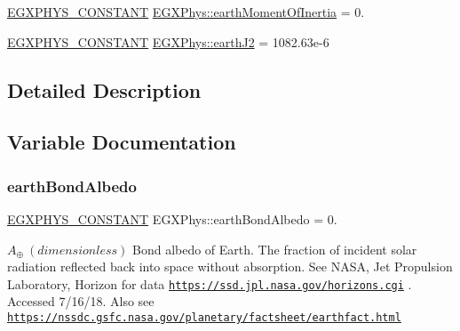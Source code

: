 \begin{DoxyCompactItemize}
\mbox{\hyperlink{group___e_g_x_phys-_constants-_macros_ga76980d288494ce1714c9ac68a95ba702}{E\+G\+X\+P\+H\+Y\+S\+\_\+\+C\+O\+N\+S\+T\+A\+NT}} \mbox{\hyperlink{group___e_g_x_phys-_constants-_astrophysics-_solar_system-_earth-_bulk_ga4b3a512e9d562530710100f65695ab13}{E\+G\+X\+Phys\+::earth\+Moment\+Of\+Inertia}} = 0.
\item 
\mbox{\hyperlink{group___e_g_x_phys-_constants-_macros_ga76980d288494ce1714c9ac68a95ba702}{E\+G\+X\+P\+H\+Y\+S\+\_\+\+C\+O\+N\+S\+T\+A\+NT}} \mbox{\hyperlink{group___e_g_x_phys-_constants-_astrophysics-_solar_system-_earth-_bulk_ga8d661a52948229a59e9eabf97af51faf}{E\+G\+X\+Phys\+::earth\+J2}} = 1082.\+63e-\/6
\end{DoxyCompactItemize}


\subsection{Detailed Description}


\subsection{Variable Documentation}
\mbox{\label{group___e_g_x_phys-_constants-_astrophysics-_solar_system-_earth-_bulk_gad71c87a7e90df69eed292f9a54376fff}} 
\subsubsection{\texorpdfstring{earth\+Bond\+Albedo}{earthBondAlbedo}}
{\footnotesize\ttfamily \mbox{\hyperlink{group___e_g_x_phys-_constants-_macros_ga76980d288494ce1714c9ac68a95ba702}{E\+G\+X\+P\+H\+Y\+S\+\_\+\+C\+O\+N\+S\+T\+A\+NT}} E\+G\+X\+Phys\+::earth\+Bond\+Albedo = 0.}

$ A_{\oplus} \ (dimensionless)$ Bond albedo of Earth. The fraction of incident solar radiation reflected back into space without absorption. See N\+A\+SA, Jet Propulsion Laboratory, Horizon for data \href{https://ssd.jpl.nasa.gov/horizons.cgi}{\tt https\+://ssd.\+jpl.\+nasa.\+gov/horizons.\+cgi} . Accessed 7/16/18. Also see \href{https://nssdc.gsfc.nasa.gov/planetary/factsheet/earthfact.html}{\tt https\+://nssdc.\+gsfc.\+nasa.\+gov/planetary/factsheet/earthfact.\+html} \mbox{\label{group___e_g_x_phys-_constants-_astrophysics-_solar_system-_earth-_bulk_ga7ff84de93ff11190d3b84d8ff8525c04}} 
